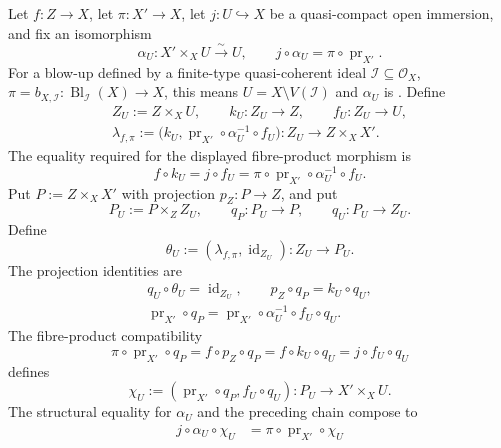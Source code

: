 \begin{definition}
  \label{def:nagata-strict-transform}

  Let $f\colon Z\to X$, let $\pi\colon X'\to X$, let
  $j\colon U\hookrightarrow X$ be a quasi-compact open immersion, and fix
  an isomorphism
  \[
    \alpha_U\colon X'\times_XU\xrightarrow{\sim}U,\qquad
    j\circ\alpha_U=\pi\circ\operatorname{pr}_{X'}.
  \]
  For a blow-up defined by a finite-type quasi-coherent ideal
  $\mathcal I\subseteq\mathcal O_X$,
  $\pi=b_{X,\mathcal I}\colon\operatorname{Bl}_{\mathcal I}(X)\to X$, this
  means $U=X\setminus V(\mathcal I)$ and $\alpha_U$ is
  .  Define
  \[
  \begin{gathered}
    Z_U:=Z\times_XU,\qquad
    k_U\colon Z_U\longrightarrow Z,\qquad
    f_U\colon Z_U\longrightarrow U,\\
    \lambda_{f,\pi}
      :=\bigl(k_U,
        \operatorname{pr}_{X'}\circ\alpha_U^{-1}\circ f_U\bigr)
      \colon Z_U\longrightarrow Z\times_XX'.
  \end{gathered}
  \]
  The equality required for the displayed fibre-product morphism is
  \[
    f\circ k_U
      =j\circ f_U
      =\pi\circ\operatorname{pr}_{X'}\circ\alpha_U^{-1}\circ f_U.
  \]
  Put $P:=Z\times_XX'$ with projection
  $p_Z\colon P\to Z$, and put
  \[
    P_U:=P\times_ZZ_U,
    \qquad
    q_P\colon P_U\to P,
    \qquad
    q_U\colon P_U\to Z_U.
  \]
  Define
  \[
    \theta_U:=(\lambda_{f,\pi},\operatorname{id}_{Z_U})
      \colon Z_U\longrightarrow P_U.
  \]
  The projection identities are
  \[
  \begin{gathered}
    q_U\circ\theta_U=\operatorname{id}_{Z_U},
    \qquad
    p_Z\circ q_P=k_U\circ q_U,\\
    \operatorname{pr}_{X'}\circ q_P
      =\operatorname{pr}_{X'}\circ\alpha_U^{-1}\circ f_U\circ q_U.
  \end{gathered}
  \]
  The fibre-product compatibility
  \[
    \pi\circ\operatorname{pr}_{X'}\circ q_P
      =f\circ p_Z\circ q_P
      =f\circ k_U\circ q_U
      =j\circ f_U\circ q_U
  \]
  defines
  \[
    \chi_U:=
      (\operatorname{pr}_{X'}\circ q_P,f_U\circ q_U)
      \colon P_U\longrightarrow X'\times_XU.
  \]
  The structural equality for $\alpha_U$ and the preceding chain compose to
  \[
  \begin{aligned}
    j\circ\alpha_U\circ\chi_U
      &=\pi\circ\operatorname{pr}_{X'}\circ\chi_U\\

\end{aligned}\]
\end{definition}
